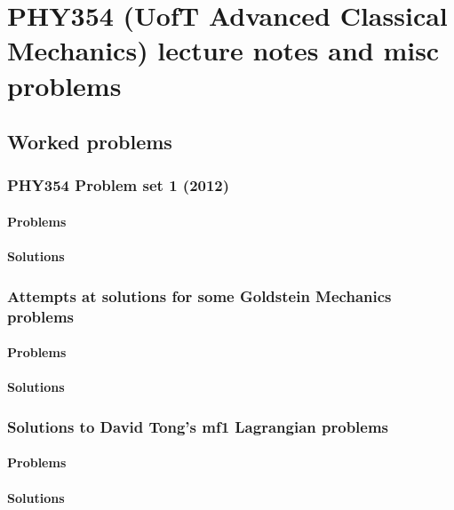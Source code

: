 \part{PHY354 (UofT Advanced Classical Mechanics) lecture notes and misc problems}
   
   
   
   

   \chapter{Worked problems}
      \section{PHY354 Problem set 1 (2012)}
         \subsection{Problems}
            
         \subsection{Solutions}
            \shipoutAnswer
      \section{Attempts at solutions for some Goldstein Mechanics problems}
         \subsection{Problems}
         	 
         \subsection{Solutions}
            \shipoutAnswer
      \section{Solutions to David Tong's mf1 Lagrangian problems}
         \subsection{Problems}
            
         \subsection{Solutions}
            \shipoutAnswer
